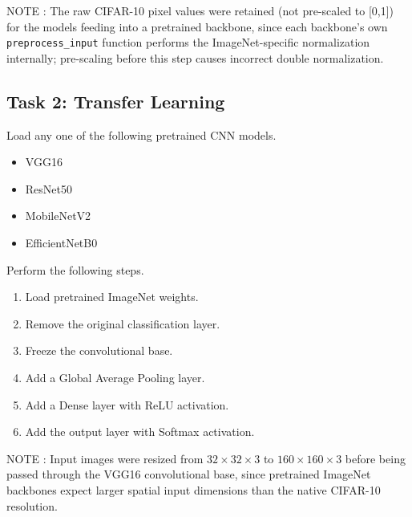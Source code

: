 \documentclass[11pt]{article}
\begin{document}
NOTE : The raw CIFAR-10 pixel values were retained (not pre-scaled to [0,1]) for the models feeding into a pretrained backbone, since each backbone's own \texttt{preprocess\_input} function performs the ImageNet-specific normalization internally; pre-scaling before this step causes incorrect double normalization.


\subsection*{Task 2: Transfer Learning}

Load any one of the following pretrained CNN models.

\begin{itemize}

\item VGG16

\item ResNet50

\item MobileNetV2

\item EfficientNetB0

\end{itemize}

Perform the following steps.

\begin{enumerate}

\item Load pretrained ImageNet weights.

\item Remove the original classification layer.

\item Freeze the convolutional base.

\item Add a Global Average Pooling layer.

\item Add a Dense layer with ReLU activation.

\item Add the output layer with Softmax activation.

\end{enumerate}

NOTE : Input images were resized from $32\times32\times3$ to $160\times160\times3$ before being passed through the VGG16 convolutional base, since pretrained ImageNet backbones expect larger spatial input dimensions than the native CIFAR-10 resolution.
\end{document}
